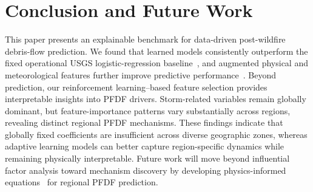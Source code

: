 \section{Conclusion and Future Work}
This paper presents an explainable benchmark for data-driven post-wildfire debris-flow prediction. We found that learned models consistently outperform the fixed operational USGS logistic-regression baseline~\cite{staley2017prediction}, and augmented physical and meteorological features further improve predictive performance~\cite{li2025typhoformer}.
%
Beyond prediction, our reinforcement learning–based feature selection provides interpretable insights into PFDF drivers. Storm-related variables remain globally dominant, but feature-importance patterns vary substantially across regions, revealing distinct regional PFDF mechanisms. These findings indicate that globally fixed coefficients are insufficient across diverse geographic zones, whereas adaptive learning models can better capture region-specific dynamics while remaining physically interpretable.
%
Future work will move beyond influential factor analysis toward mechanism discovery by developing physics-informed equations~\cite{dahal2025towards} for regional PFDF prediction.

